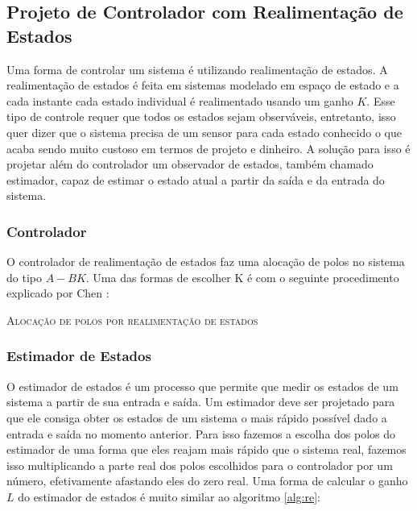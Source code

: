 \subsection{Projeto de Controlador com Realimentação de Estados}

Uma forma de controlar um sistema é utilizando realimentação de estados. A realimentação de estados é feita em sistemas modelado em espaço de estado e a cada instante cada estado individual é realimentado usando um ganho $K$. Esse tipo de controle requer que todos os estados sejam observáveis, entretanto, isso quer dizer que o sistema precisa de um sensor para cada estado conhecido o que acaba sendo muito custoso em termos de projeto e dinheiro. A solução para isso é projetar além do controlador um observador de estados, também chamado estimador, capaz de estimar o estado atual a partir da saída e da entrada do sistema.

\subsubsection{Controlador}

O controlador de realimentação de estados faz uma alocação de polos no sistema do tipo $A-BK$. Uma das formas de escolher K é com o seguinte procedimento explicado por Chen \cite{chen1998}:

\IncMargin{1em}
\begin{algorithm}[H]
	
	\label{alg:re}
	\caption{\textsc{Alocação de polos por realimentação de estados}}
\end{algorithm}
\DecMargin{1em}

\subsubsection{Estimador de Estados}

O estimador de estados é um processo que permite que medir os estados de um sistema a partir de sua entrada e saída. Um estimador deve ser projetado para que ele consiga obter os estados de um sistema o mais rápido possível dado a entrada e saída no momento anterior. Para isso fazemos a escolha dos polos do estimador de uma forma que eles reajam mais rápido que o sistema real, fazemos isso multiplicando a parte real dos polos escolhidos para o controlador por um número, efetivamente afastando eles do zero real. Uma forma de calcular o ganho $L$ do estimador de estados é muito similar ao algoritmo \ref{alg:re}:

